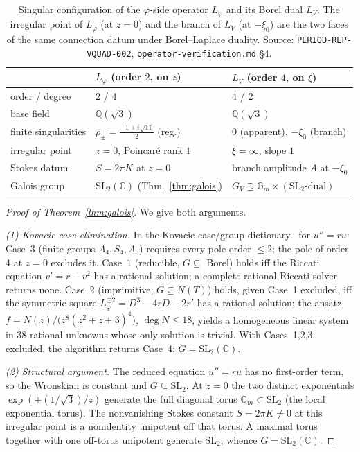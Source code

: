 \documentclass[11pt,reqno]{amsart}
\renewcommand{\_}{\vquadorigunderscore\allowbreak}
\theoremstyle{plain}
\theoremstyle{definition}
\newcommand{\Lphi}{L_{\varphi}}
\newcommand{\LV}{L_{V}}
\newcommand{\Qsqrt}{\mathbb{Q}(\sqrt3)}
\newcommand{\xizero}{\xi_0}
\newcommand{\SL}{\mathrm{SL}}
\newcommand{\Gm}{\mathbb{G}_m}
\begin{document}
\begin{table}[h]
\centering
\begin{tabular}{@{}lll@{}}
\toprule
 & $\Lphi$ (order $2$, on $z$) & $\LV$ (order $4$, on $\xi$) \\
\midrule
order / degree & $2$ / $4$ & $4$ / $2$ \\
base field & $\Qsqrt$ & $\Qsqrt$ \\
finite singularities & $\rho_\pm=\tfrac{-1\pm i\sqrt{11}}2$ (reg.) & $0$ (apparent), $-\xizero$ (branch) \\
irregular point & $z=0$, Poincar\'e rank $1$ & $\xi=\infty$, slope $1$ \\
Stokes datum & $S=2\pi K$ at $z=0$ & branch amplitude $A$ at $-\xizero$ \\
Galois group & $\SL_2(\mathbb{C})$ (Thm.~\ref{thm:galois}) & $G_V\supseteq\Gm\times(\SL_2\text{-dual})$ \\
\bottomrule
\end{tabular}
\caption{Singular configuration of the $\varphi$-side operator $\Lphi$ and its Borel dual $\LV$.
The irregular point of $\Lphi$ (at $z=0$) and the branch of $\LV$ (at $-\xizero$) are the two
faces of the same connection datum under Borel--Laplace duality. Source:
\texttt{PERIOD-REP-VQUAD-002}, \texttt{operator-verification.md} \S4.}
\label{tab:config}
\end{table}

\begin{proof}[Proof of Theorem~\ref{thm:galois}]
We give both arguments.

\emph{(1) Kovacic case-elimination.} In the Kovacic case/group
dictionary~\cite{Kovacic,vdPS} for $u''=ru$: Case~3 (finite groups $A_4,S_4,A_5$) requires every
pole order $\le2$; the pole of order $4$ at $z=0$ excludes it. Case~1 (reducible, $G\subseteq$
Borel) holds iff the Riccati equation $v'=r-v^2$ has a rational solution; a complete rational
Riccati solver returns none. Case~2 (imprimitive, $G\subseteq N(T)$) holds, given Case~1
excluded, iff the symmetric square $\Lphi^{\odot2}=D^3-4rD-2r'$ has a rational solution; the
ansatz $f=N(z)/\bigl(z^8(z^2+z+3)^4\bigr)$, $\deg N\le18$, yields a homogeneous linear system in
$38$ rational unknowns whose only solution is trivial. With Cases~1,2,3 excluded, the algorithm
returns Case~4: $G=\SL_2(\mathbb{C})$.

\emph{(2) Structural argument.} The reduced equation $u''=ru$ has no first-order term, so the
Wronskian is constant and $G\subseteq\SL_2$. At $z=0$ the two distinct exponentials
$\exp(\pm(1/\sqrt3)/z)$ generate the full diagonal torus $\mathbb{G}_m\subset\SL_2$ (the local
exponential torus). The nonvanishing Stokes constant $S=2\pi K\ne0$ at this irregular point is a
nonidentity unipotent off that torus. A maximal torus together with one off-torus unipotent
generate $\SL_2$, whence $G=\SL_2(\mathbb{C})$.
\end{proof}
\end{document}
